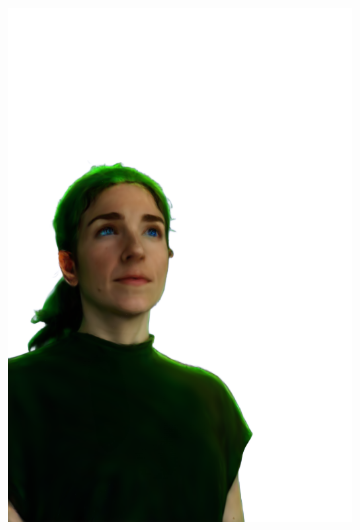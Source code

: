 \begin{figure}[ht]
\begin{subfigure}{0.08\linewidth}
        \includegraphics[width=\textwidth]{Figures/results/low/irene_elf/11_render.png}

\end{subfigure}
\end{figure}
